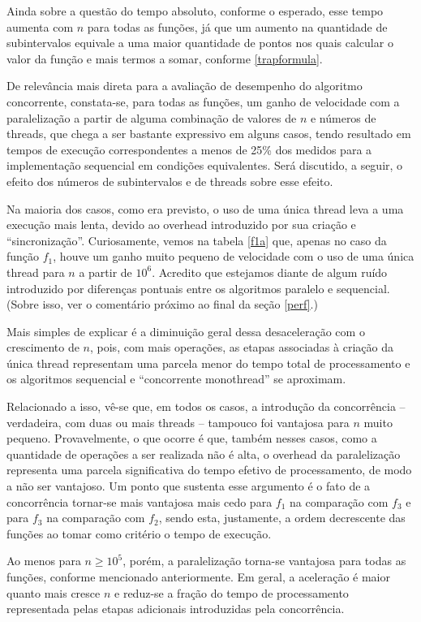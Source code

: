 \documentclass{article}
\begin{document}
  Ainda sobre a questão do tempo absoluto, conforme o esperado, esse tempo aumenta com $n$ para todas as funções, já que um aumento na quantidade de subintervalos equivale a uma maior quantidade de pontos nos quais calcular o valor da função e mais termos a somar, conforme \eqref{trapformula}.

  De relevância mais direta para a avaliação de desempenho do algoritmo concorrente, constata-se, para todas as funções, um ganho de velocidade com a paralelização a partir de alguma combinação de valores de $n$ e números de threads, que chega a ser bastante expressivo em alguns casos, tendo resultado em tempos de execução correspondentes a menos de 25\% dos medidos para a implementação sequencial em condições equivalentes. Será discutido, a seguir, o efeito dos números de subintervalos e de threads sobre esse efeito.

  Na maioria dos casos, como era previsto, o uso de uma única thread leva a uma execução mais lenta, devido ao overhead introduzido por sua criação e ``sincronização''. Curiosamente, vemos na tabela \ref{f1a} que, apenas no caso da função $f_1$, houve um ganho muito pequeno de velocidade com o uso de uma única thread para $n$ a partir de $10^6$. Acredito que estejamos diante de algum ruído introduzido por diferenças pontuais entre os algoritmos paralelo e sequencial. (Sobre isso, ver o comentário próximo ao final da seção \ref{perf}.)
  
  Mais simples de explicar é a diminuição geral dessa desaceleração com o crescimento de $n$, pois, com mais operações, as etapas associadas à criação da única thread representam uma parcela menor do tempo total de processamento e os algoritmos sequencial e ``concorrente monothread'' se aproximam.

  Relacionado a isso, vê-se que, em todos os casos, a introdução da concorrência -- verdadeira, com duas ou mais threads -- tampouco foi vantajosa para $n$ muito pequeno. Provavelmente, o que ocorre é que, também nesses casos, como a quantidade de operações a ser realizada não é alta, o overhead da paralelização representa uma parcela significativa do tempo efetivo de processamento, de modo a não ser vantajoso. Um ponto que sustenta esse argumento é o fato de a concorrência tornar-se mais vantajosa mais cedo para $f_1$ na comparação com $f_3$ e para $f_3$ na comparação com $f_2$, sendo esta, justamente, a ordem decrescente das funções ao tomar como critério o tempo de execução.

  Ao menos para $n \geq 10^5$, porém, a paralelização torna-se vantajosa para todas as funções, conforme mencionado anteriormente. Em geral, a aceleração é maior quanto mais cresce $n$ e reduz-se a fração do tempo de processamento representada pelas etapas adicionais introduzidas pela concorrência.
\end{document}
